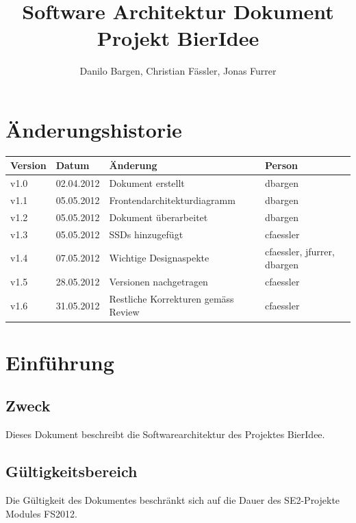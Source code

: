 \documentclass[10pt,a4paper]{scrartcl}
\author{Danilo Bargen, Christian Fässler, Jonas Furrer}
\title{Software Architektur Dokument\\ Projekt BierIdee}
\begin{document}
\begin{titlepage}
	\maketitle
	\vspace{120mm}
	\thispagestyle{empty} %
\end{titlepage}

\tableofcontents
\newpage

\section*{Änderungshistorie}
\begin{tabular}{p{}p{}p{}p{}}
\toprule
\textbf{Version} & \textbf{Datum} & \textbf{Änderung} & \textbf{Person} \\  
\midrule
v1.0 & 02.04.2012 & Dokument erstellt & dbargen \\  
\hline 
v1.1 & 05.05.2012 & Frontendarchitekturdiagramm & dbargen \\  
\hline 
v1.2 & 05.05.2012 & Dokument überarbeitet & dbargen \\  
\hline 
v1.3 & 05.05.2012 & SSDs hinzugefügt & cfaessler \\  
\hline 
v1.4 & 07.05.2012 & Wichtige Designaspekte & cfaessler, jfurrer, dbargen \\ 
\hline
v1.5 &  28.05.2012 & Versionen nachgetragen & cfaessler \\
\hline
v1.6 & 31.05.2012 & Restliche Korrekturen gemäss Review & cfaessler\\
\bottomrule
\end{tabular} 
\newpage

\section{Einführung}

\subsection{Zweck}
Dieses Dokument beschreibt die Softwarearchitektur des Projektes BierIdee.

\subsection{Gültigkeitsbereich}
Die Gültigkeit des Dokumentes beschränkt sich auf die Dauer des SE2-Projekte Modules FS2012.
\end{document}
